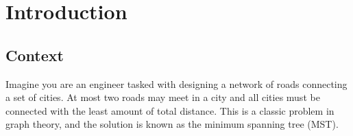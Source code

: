 \documentclass{l4proj}
\begin{document}
%
%
%

%
%
%
%
\chapter{Introduction}



\section{Context}
Imagine you are an engineer tasked with designing a network of roads connecting a set of cities. At most two roads may meet in a city and all cities must be connected with the least amount of total distance. This is a classic problem in graph theory, and the solution is known as the minimum spanning tree (MST).
\end{document}
